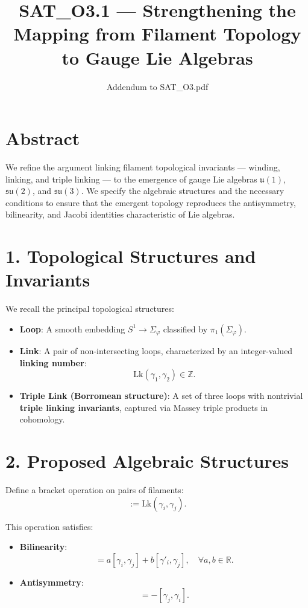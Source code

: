 \documentclass{article}
\title{SAT\_O3.1 --- Strengthening the Mapping from Filament Topology to Gauge Lie Algebras}
\author{Addendum to SAT\_O3.pdf}
\date{}
\begin{document}
\maketitle

\section*{Abstract}
We refine the argument linking filament topological invariants --- winding, linking, and triple linking --- to the emergence of gauge Lie algebras $\mathfrak{u}(1)$, $\mathfrak{su}(2)$, and $\mathfrak{su}(3)$. We specify the algebraic structures and the necessary conditions to ensure that the emergent topology reproduces the antisymmetry, bilinearity, and Jacobi identities characteristic of Lie algebras.

\section*{1. Topological Structures and Invariants}

We recall the principal topological structures:
\begin{itemize}
    \item \textbf{Loop}: A smooth embedding $S^1 \to \Sigma_\varphi$ classified by $\pi_1(\Sigma_\varphi)$.
    \item \textbf{Link}: A pair of non-intersecting loops, characterized by an integer-valued \textbf{linking number}:
    \begin{equation}
    \text{Lk}(\gamma_1, \gamma_2) \in \mathbb{Z}.
    \end{equation}
    \item \textbf{Triple Link (Borromean structure)}: A set of three loops with nontrivial \textbf{triple linking invariants}, captured via Massey triple products in cohomology.
\end{itemize}

\section*{2. Proposed Algebraic Structures}

Define a bracket operation on pairs of filaments:
\begin{equation}
[\gamma_i, \gamma_j] := \text{Lk}(\gamma_i, \gamma_j).
\end{equation}

This operation satisfies:
\begin{itemize}
    \item \textbf{Bilinearity}:
    \begin{equation}
    [a \gamma_i + b \gamma'_i, \gamma_j] = a [\gamma_i, \gamma_j] + b [\gamma'_i, \gamma_j], \quad \forall a,b \in \mathbb{R}.
    \end{equation}
    \item \textbf{Antisymmetry}:
    \begin{equation}
    [\gamma_i, \gamma_j] = -[\gamma_j, \gamma_i].
    \end{equation}
\end{itemize}
\end{document}
